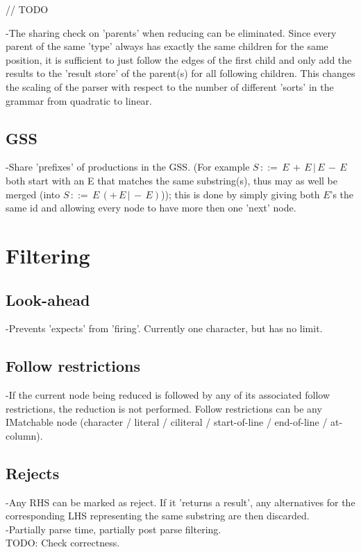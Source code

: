 \documentclass[a4paper,10pt]{article}
\begin{document}
// TODO 

-The sharing check on 'parents' when reducing can be eliminated. Since every parent of the same 'type' always has exactly the same children for the same position, it is sufficient to just follow the edges of the first child and only add the results to the 'result store' of the parent(s) for all following children. This changes the scaling of the parser with respect to the number of different 'sorts' in the grammar from quadratic to linear.

\subsection{GSS}

-Share 'prefixes' of productions in the GSS. (For example $S\,::=\,E\,+\,E\,|\,E\,-\,E$ both start with an E that matches the same substring(s), thus may as well be merged (into $S\,::=\,E\,(+\,E\,|\,-\,E)$)); this is done by simply giving both $E$'s the same id and allowing every node to have more then one 'next' node.

\section{Filtering}

\subsection{Look-ahead}

-Prevents 'expects' from 'firing'. Currently one character, but has no limit.

\subsection{Follow restrictions}

-If the current node being reduced is followed by any of its associated follow restrictions, the reduction is not performed. Follow restrictions can be any IMatchable node (character / literal / ciliteral / start-of-line / end-of-line / at-column).

\subsection{Rejects}

-Any RHS can be marked as reject. If it 'returns a result', any alternatives for the corresponding LHS representing the same substring are then discarded.\\
-Partially parse time, partially post parse filtering. \\
TODO: Check correctness.
\end{document}
